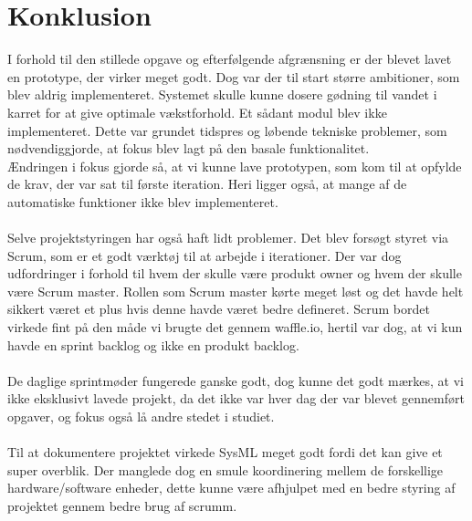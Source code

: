 \chapter{Konklusion}
I forhold til den stillede opgave og efterfølgende afgrænsning er der blevet lavet en prototype, der virker meget godt. Dog var der til start større ambitioner, som blev aldrig implementeret. Systemet skulle kunne dosere gødning til vandet i karret for at give optimale vækstforhold. Et sådant modul blev ikke implementeret. Dette var grundet tidspres og løbende tekniske problemer, som nødvendiggjorde, at fokus blev lagt på den basale funktionalitet. \\ Ændringen i fokus gjorde så, at vi kunne lave prototypen, som kom til at opfylde de krav, der var sat til første iteration. Heri ligger også, at mange af de automatiske funktioner ikke blev implementeret.\\\\
Selve projektstyringen har også haft lidt problemer. Det blev forsøgt styret via Scrum, som er et godt værktøj til at arbejde i iterationer. Der var dog udfordringer i forhold til hvem der skulle være produkt owner og hvem der skulle være Scrum master. Rollen som Scrum master kørte meget løst og det havde helt sikkert været et plus hvis denne havde været bedre defineret. Scrum bordet virkede fint på den måde vi brugte det gennem waffle.io, hertil var dog, at vi kun havde en sprint backlog og ikke en produkt backlog.\\\\
De daglige sprintmøder fungerede ganske godt, dog kunne det godt mærkes, at vi ikke eksklusivt lavede projekt, da det ikke var hver dag der var blevet gennemført opgaver, og fokus også lå andre stedet i studiet.\\\\
Til at dokumentere projektet virkede SysML meget godt fordi det kan give et super overblik. Der manglede dog en smule koordinering mellem de forskellige hardware/software enheder, dette kunne være afhjulpet med en bedre styring af projektet gennem bedre brug af scrumm.
